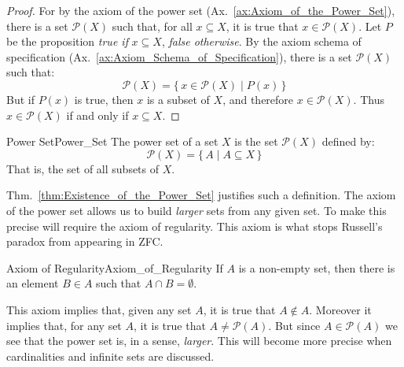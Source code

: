         \begin{proof}
            For by the axiom of the power set
            (Ax.~\ref{ax:Axiom_of_the_Power_Set}), there is a set
            $\mathscr{P}(X)$ such that, for all $x\subseteq{X}$, it is true
            that $x\in\mathscr{P}(X)$. Let $P$ be the proposition
            \textit{true if} $x\subseteq{X}$, \textit{false otherwise}. By the
            axiom schema of specification
            (Ax.~\ref{ax:Axiom_Schema_of_Specification}), there is a set
            $\mathcal{P}(X)$ such that:
            \begin{equation}
                \mathcal{P}(X)=\{\,x\in\mathscr{P}(X)\;|\;P(x)\,\}
            \end{equation}
            But if $P(x)$ is true, then $x$ is a subset of $X$, and therefore
            $x\in\mathscr{P}(X)$. Thus $x\in\mathcal{P}(X)$ if and only if
            $x\subseteq{X}$.
        \end{proof}
        \begin{fdefinition}{Power Set}{Power_Set}
            The power set of a set $X$ is the set $\mathcal{P}(X)$ defined by:
            \begin{equation}
                \mathcal{P}(X)=\{\,A\;|\;A\subseteq{X}\,\}
            \end{equation}
            That is, the set of all subsets of $X$.
        \end{fdefinition}
        Thm.~\ref{thm:Existence_of_the_Power_Set} justifies such a definition.
        The axiom of the power set allows us to build \textit{larger} sets from
        any given set. To make this precise will require the axiom of
        regularity. This axiom is what stops Russell's paradox from appearing
        in ZFC.
        \begin{faxiom}{Axiom of Regularity}{Axiom_of_Regularity}
            If $A$ is a non-empty set, then there is an element $B\in{A}$
            such that $A\cap{B}=\emptyset$.
        \end{faxiom}
        This axiom implies that, given any set $A$, it is true that
        $A\notin{A}$. Moreover it implies that, for any set $A$, it is true
        that $A\ne\mathcal{P}(A)$. But since $A\in\mathcal{P}(A)$ we see that
        the power set is, in a sense, \textit{larger}. This will become more
        precise when cardinalities and infinite sets are discussed.
